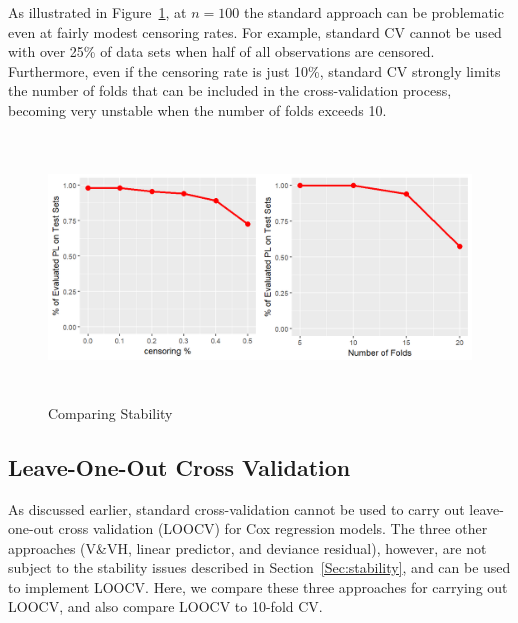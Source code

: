 

\par As illustrated in Figure~\ref{Fig:stability}, at $n=100$ the standard approach can be problematic even at fairly modest censoring rates.  For example, standard CV cannot be used with over 25\% of data sets when half of all observations are censored.  Furthermore, even if the censoring rate is just 10\%, standard CV strongly limits the number of folds that can be included in the cross-validation process, becoming very unstable when the number of folds exceeds 10.

\begin{figure}[h]
  \centering
  \includegraphics[height= 7cm ]{./figures/figure_3_new.png}
  \caption{\label{Fig:stability}Comparing Stability }
\end{figure}	

\subsection {Leave-One-Out Cross Validation}
\label{Sec:loocv}

As discussed earlier, standard cross-validation cannot be used to carry out leave-one-out cross validation (LOOCV) for Cox regression models.  The three other approaches (V\&VH, linear predictor, and deviance residual), however, are not subject to the stability issues described in Section~\ref{Sec:stability}, and can be used to implement LOOCV.  Here, we compare these three approaches for carrying out LOOCV, and also compare LOOCV to 10-fold CV.

